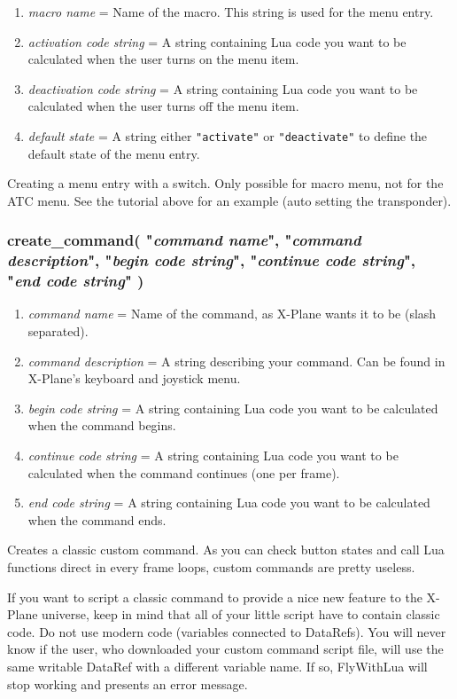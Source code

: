 \documentclass[11pt,parskip=half,a4paper]{scrartcl}
\begin{document}
\begin{enumerate}
	\item \emph{macro name} = Name of the macro. This string is used for the menu entry.
	\item \emph{activation code string} = A string containing Lua code you want to be calculated when the user turns on the menu item.
	\item \emph{deactivation code string} = A string containing Lua code you want to be calculated when the user turns off the menu item.
	\item \emph{default state} = A string either \verb|"activate"| or \verb|"deactivate"| to define the default state of the menu entry.
\end{enumerate}

Creating a menu entry with a switch. Only possible for macro menu, not for the ATC menu. See the tutorial above for an example (auto setting the transponder).

\subsubsection{create\_command( "\emph{command name}", "\emph{command description}", "\emph{begin code string}", "\emph{continue code string}", "\emph{end code string}" )}

\begin{enumerate}
	\item \emph{command name} = Name of the command, as X-Plane wants it to be (slash separated).
	\item \emph{command description} = A string describing your command. Can be found in X-Plane's keyboard and joystick menu.
	\item \emph{begin code string} = A string containing Lua code you want to be calculated when the command begins.
	\item \emph{continue code string} = A string containing Lua code you want to be calculated when the command continues (one per frame).
	\item \emph{end code string} = A string containing Lua code you want to be calculated when the command ends.
\end{enumerate}

Creates a classic custom command. As you can check button states and call Lua functions direct in every frame loops, custom commands are pretty useless.

If you want to script a classic command to provide a nice new feature to the X-Plane universe, keep in mind that all of your little script have to contain classic code. Do not use modern code (variables connected to DataRefs). You will never know if the user, who downloaded your custom command script file, will use the same writable DataRef with a different variable name. If so, FlyWithLua will stop working and presents an error message.
\end{document}
